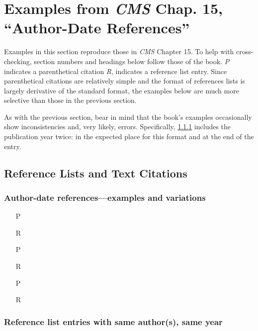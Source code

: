 \documentclass[11pt,letterpaper,oneside]{article}
\begin{document}
\section{Examples from \emph{CMS} Chap. 15, ``Author-Date
References''}
\label{paren16}

Examples in this section reproduce those in \textit{CMS} Chapter 15.
To help with cross-checking, section numbers and headings below follow
those of the book. \textit{P} indicates a parenthetical citation
\textit{R}, indicates a reference list entry. Since parenthetical
citations are relatively simple and the format of references lists is
largely derivative of the standard format, the examples below are much
more selective than those in the previous section.

As with the previous section, bear in mind that the book's examples
occasionally show inconsistencies and, very likely, errors.
Specifically, \ref{15.9} includes the publication year twice: in the
expected place for this format and at the end of the entry.

\subsection{Reference Lists and Text Citations}
\setcounter{subsection}{15}

\setcounter{subsubsection}{8}
\subsubsection{Author-date references---examples and variations}
\label{15.9}

\begin{itemize}
\item[P] 

\item[R] 

\item[P] 

\item[R] 

\item[P] 

\item[R] 
\end{itemize}

\setcounter{subsubsection}{18}
\subsubsection{Reference list entries with same author(s), same year}
\label{15.19}
\end{document}
